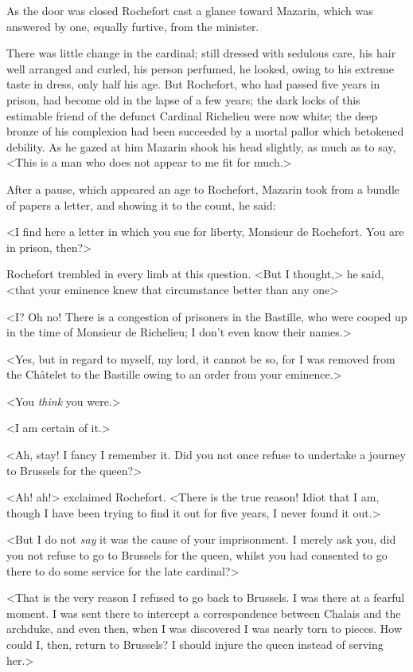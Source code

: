 As the door was closed Rochefort cast a glance toward Mazarin, which was answered by one, equally furtive, from the minister.

There was little change in the cardinal; still dressed with sedulous care, his hair well arranged and curled, his person perfumed, he looked, owing to his extreme taste in dress, only half his age. But Rochefort, who had passed five years in prison, had become old in the lapse of a few years; the dark locks of this estimable friend of the defunct Cardinal Richelieu were now white; the deep bronze of his complexion had been succeeded by a mortal pallor which betokened debility. As he gazed at him Mazarin shook his head slightly, as much as to say, <This is a man who does not appear to me fit for much.>

After a pause, which appeared an age to Rochefort, Mazarin took from a bundle of papers a letter, and showing it to the count, he said:

<I find here a letter in which you sue for liberty, Monsieur de Rochefort. You are in prison, then?>

Rochefort trembled in every limb at this question. <But I thought,> he said, <that your eminence knew that circumstance better than any one\longdash>

<I\@? Oh no! There is a congestion of prisoners in the Bastille, who were cooped up in the time of Monsieur de Richelieu; I don't even know their names.>

<Yes, but in regard to myself, my lord, it cannot be so, for I was removed from the Châtelet to the Bastille owing to an order from your eminence.>

<You \emph{think} you were.>

<I am certain of it.>

<Ah, stay! I fancy I remember it. Did you not once refuse to undertake a journey to Brussels for the queen?>

<Ah! ah!> exclaimed Rochefort. <There is the true reason! Idiot that I am, though I have been trying to find it out for five years, I never found it out.>

<But I do not \emph{say} it was the cause of your imprisonment. I merely ask you, did you not refuse to go to Brussels for the queen, whilst you had consented to go there to do some service for the late cardinal?>

<That is the very reason I refused to go back to Brussels. I was there at a fearful moment. I was sent there to intercept a correspondence between Chalais and the archduke, and even then, when I was discovered I was nearly torn to pieces. How could I, then, return to Brussels? I should injure the queen instead of serving her.>

